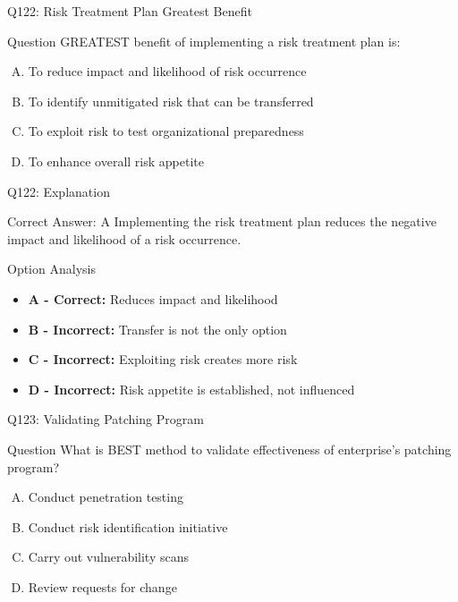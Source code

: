 \documentclass{beamer}
\begin{document}
	\begin{frame}{Q122: Risk Treatment Plan Greatest Benefit}
		\begin{block}{Question}
			GREATEST benefit of implementing a risk treatment plan is:
		\end{block}
		\begin{enumerate}[(A)]
			\item To reduce impact and likelihood of risk occurrence
			\item To identify unmitigated risk that can be transferred
			\item To exploit risk to test organizational preparedness
			\item To enhance overall risk appetite
		\end{enumerate}
	\end{frame}
	
	\begin{frame}{Q122: Explanation}
		\begin{block}{Correct Answer: A}
			Implementing the risk treatment plan reduces the negative impact and likelihood of a risk occurrence.
		\end{block}
		\begin{block}{Option Analysis}
			\begin{itemize}
				\item \textbf{A - Correct:} Reduces impact and likelihood
				\item \textbf{B - Incorrect:} Transfer is not the only option
				\item \textbf{C - Incorrect:} Exploiting risk creates more risk
				\item \textbf{D - Incorrect:} Risk appetite is established, not influenced
			\end{itemize}
		\end{block}
	\end{frame}
	
	\begin{frame}{Q123: Validating Patching Program}
		\begin{block}{Question}
			What is BEST method to validate effectiveness of enterprise's patching program?
		\end{block}
		\begin{enumerate}[(A)]
			\item Conduct penetration testing
			\item Conduct risk identification initiative
			\item Carry out vulnerability scans
			\item Review requests for change
		\end{enumerate}
	\end{frame}
	
\end{document}
